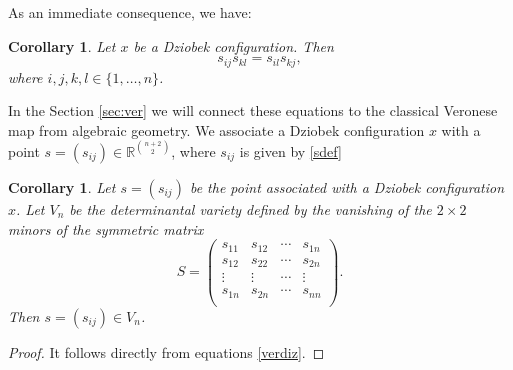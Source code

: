 \documentclass{amsart}
\newtheorem{corollary}[theorem]{Corollary}
\theoremstyle{definition}
\newtheorem{definition}[theorem]{Definition}
\theoremstyle{remark}
\numberwithin{equation}{section}
\begin{document}
As an immediate consequence, we have:

\begin{corollary}\label{corverdiz}
Let $x$ be a Dziobek configuration. Then
\begin{equation}\label{verdiz}
    s_{ij} s_{kl} = s_{il}s_{kj},
\end{equation}
where $i, j, k, l \in \{1, \dots, n\}$.
\end{corollary}

In the Section \ref{sec:ver} we will connect these equations to the classical Veronese map from algebraic geometry.  We associate a Dziobek configuration $x$ with a point $s=(s_{ij}) \in \mathbb{R}^{\binom{n+2}{2}}$, where $s_{ij}$ is given by \eqref{sdef}

\begin{corollary}
Let $s=(s_{ij})$ be the point associated with a Dziobek configuration $x$. Let $V_n$ be the determinantal variety defined by the vanishing of the $2 \times 2$ minors of the symmetric matrix
$$S=\left(\begin{array}{cccc}
s_{11}&s_{12}&\cdots&s_{1n}\\
s_{12}&s_{22}&\cdots&s_{2n}\\
\vdots&\vdots&\cdots&\vdots\\
s_{1n}&s_{2n}&\cdots&s_{nn}\\
\end{array}\right).$$
Then $s=(s_{ij}) \in V_n$.
\end{corollary}

\begin{proof}
It follows directly from equations \eqref{verdiz}.
\end{proof}








\end{document}
